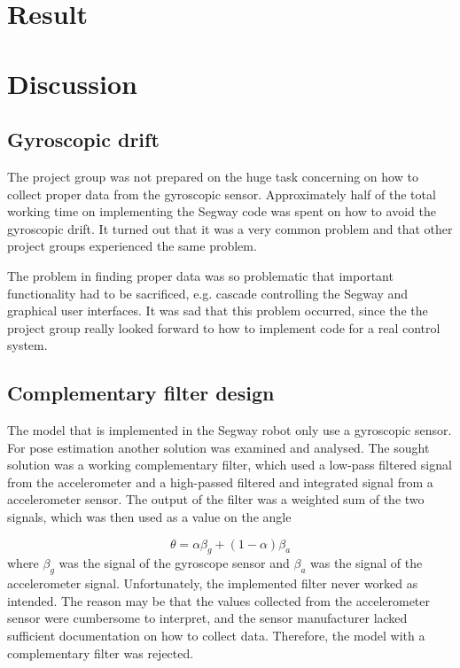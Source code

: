 \section{Result}

\section{Discussion}

\subsection{Gyroscopic drift}
The project group was not prepared on the huge task concerning on how to collect proper data from the gyroscopic sensor. Approximately half of the total working time on implementing the Segway code was spent on how to avoid the gyroscopic drift. 
It turned out that it was a very common problem and that other project groups experienced the same problem. 

\noindent The problem in finding proper data was so problematic that important functionality had to be sacrificed, e.g. cascade controlling the Segway and graphical user interfaces. It was sad that this problem occurred, since the the project group really looked forward to how to implement code for a real control system. 

\subsection{Complementary filter design}
The model that is implemented in the Segway robot only use a gyroscopic sensor. For pose estimation another solution was examined and analysed. The sought solution was a working complementary filter, which used a low-pass filtered signal from the accelerometer and a high-passed filtered and integrated signal from a accelerometer sensor. The output of the filter was a weighted sum of the two signals, which was then used as a value on the angle 
 
\begin{displaymath}
\theta = \alpha \beta_{g} + (1-\alpha)\beta_{a}
\end{displaymath}
where $\beta_g$ was the signal of the gyroscope sensor and $\beta_a$ was the signal of the accelerometer signal. Unfortunately, the implemented filter never worked as intended. The reason may be that the values collected from the accelerometer sensor were cumbersome to interpret, and the sensor manufacturer lacked sufficient documentation on how to collect data. Therefore, the model with a complementary filter was rejected.

\newpage


\theendnotes
